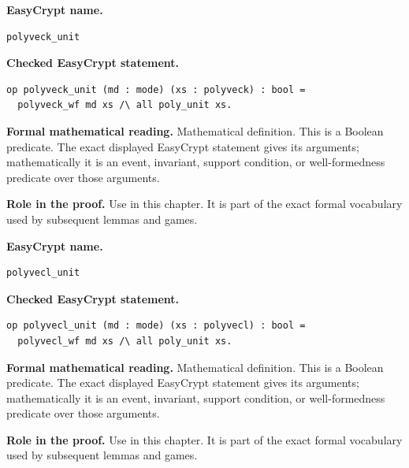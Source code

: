 \begin{formaldefinition}
\noindent\textbf{EasyCrypt name.}
\begin{lstlisting}[language=EasyCrypt,basicstyle=\ttfamily\scriptsize]
polyveck_unit
\end{lstlisting}
\noindent\textbf{Checked EasyCrypt statement.}
\begin{lstlisting}[language=EasyCrypt,basicstyle=\ttfamily\scriptsize]
op polyveck_unit (md : mode) (xs : polyveck) : bool =
  polyveck_wf md xs /\ all poly_unit xs.
\end{lstlisting}
\noindent\textbf{Formal mathematical reading.}
Mathematical definition. This is a Boolean predicate.  The exact displayed EasyCrypt statement gives its arguments; mathematically it is an event, invariant, support condition, or well-formedness predicate over those arguments.

\noindent\textbf{Role in the proof.}
Use in this chapter. It is part of the exact formal vocabulary used by subsequent lemmas and games.

\end{formaldefinition}

\begin{formaldefinition}
\noindent\textbf{EasyCrypt name.}
\begin{lstlisting}[language=EasyCrypt,basicstyle=\ttfamily\scriptsize]
polyvecl_unit
\end{lstlisting}
\noindent\textbf{Checked EasyCrypt statement.}
\begin{lstlisting}[language=EasyCrypt,basicstyle=\ttfamily\scriptsize]
op polyvecl_unit (md : mode) (xs : polyvecl) : bool =
  polyvecl_wf md xs /\ all poly_unit xs.
\end{lstlisting}
\noindent\textbf{Formal mathematical reading.}
Mathematical definition. This is a Boolean predicate.  The exact displayed EasyCrypt statement gives its arguments; mathematically it is an event, invariant, support condition, or well-formedness predicate over those arguments.

\noindent\textbf{Role in the proof.}
Use in this chapter. It is part of the exact formal vocabulary used by subsequent lemmas and games.

\end{formaldefinition}

